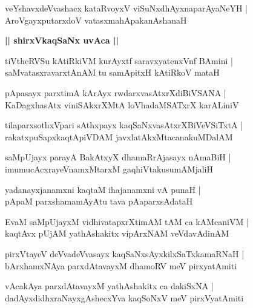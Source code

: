 \documentclass[twoside,12pt,openright]{book}
\newcounter{shloka}[chapter]
\def\uvaca#1{\centerline{{\large\textbf{#1}}}}
\begin{document}
\begin{shloka}%
veYshavxdeVvashacx kataRvoyxV viSuNxdhAyxnaparAyaNeYH |\\
AroVgayxputarxdoV vatasxmahApakanAshanaH 
\end{shloka}

\uvaca{|| shirxVkaqSaNx uvAca ||}

\begin{shloka}%
tiVtheRVSu kAtiRkiVM kurAyxtf saravxyatenxVnf BAmini |\\
saMvatasxravarxtAnAM tu samApitxH kAtiRkoV mataH 
\end{shloka}

\begin{shloka}%
pApasayx parxtimA kArAyx rwdarxvasAtxrXdiBiVSANA |\\
KaDagxhasAtx viniSAkxrXMtA loVhadaMSATxrX karALiniV 
\end{shloka}

\begin{shloka}%
tilaparxsothxVpari sAthxpayx kaqSaNxvasAtxrXBiVeVSiTxtA |\\
rakatxpuSapxkaqtApiVDAM javxlatAkxMtacanakuMDalAM
\end{shloka}

\begin{shloka}%
saMpUjayx parayA BakAtxyX dhamaRrAjasayx nAmaBiH |\\
imumucAcxrayeVnamxMtarxM gaqhiVtakusumAMjaliH 
\end{shloka}

\begin{shloka}%
yadanayxjanamxni kaqtaM ihajanamxni vA punaH |\\
pApaM parxshamamAyAtu tava pAaparxsAdataH 
\end{shloka}

\begin{shloka}%
EvaM saMpUjayxM vidhivatapxrXtimAM tAM ca kAMcaniVM |\\
kaqtAvx pUjAM yathAshakitx vipArxNAM veVdavAdinAM 
\end{shloka}

\begin{shloka}%
pirxVtayeV deVvadeVvasayx kaqSaNxsAyxkilxSaTxkamaRNaH |\\
bArxhamxNAya parxdAtavayxM dhamoRV meV pirxyatAmiti
\end{shloka}

\begin{shloka}%
vAcakAya parxdAtavayxM yathAshakitx ca dakiSxNA |\\
dadAyxdidhxraNayxgAshecxYva kaqSoNxV meV pirxVyatAmiti
\end{shloka}
\end{document}
